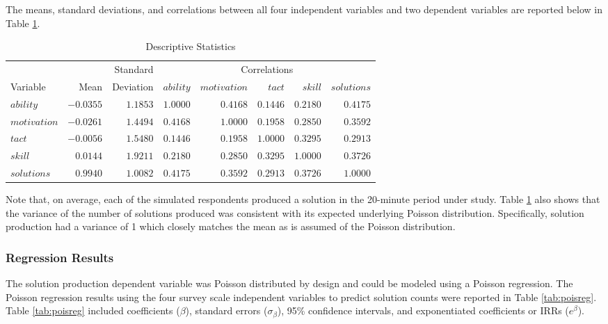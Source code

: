 \documentclass[man]{apa7}
\begin{document}
	The means, standard deviations, and correlations between all four independent variables and two dependent variables are reported below in Table \ref{tab:desc}. 
	
	\begin{table}[h!]
		\centering
		\caption{\centering Descriptive Statistics} 
		\begin{tabular}{lrr|rrrrr}
			\hline 
			&  & Standard & \multicolumn{5}{c}{Correlations} \\ 
			Variable & Mean & Deviation & $ability$ & $motivation$ & $tact$ & $skill$ & $solutions$ \\ 
			\hline
			$ability$ & $-0.0355$ & $1.1853$ & $1.0000$ & $0.4168$ & $0.1446$ & $0.2180$ & $0.4175$ \\ 
			$motivation$ & $-0.0261$ & $1.4494$ & $0.4168$ & $1.0000$ & $0.1958$ & $0.2850$ & $0.3592$ \\ 
			$tact$ & $-0.0056$ & $1.5480$ & $0.1446$ & $0.1958$ & $1.0000$ & $0.3295$ & $0.2913$ \\ 
			$skill$ & $0.0144$ & $1.9211$ & $0.2180$ & $0.2850$ & $0.3295$ & $1.0000$ & $0.3726$ \\ 
			$solutions$ & $0.9940$ & $1.0082$ & $0.4175$ & $0.3592$ & $0.2913$ & $0.3726$ & $1.0000$ \\ 
			\hline 
		\end{tabular}
		\label{tab:desc}
	\end{table}
	
	Note that, on average, each of the simulated respondents produced a solution in the 20-minute period under study.
	Table \ref{tab:desc} also shows that the variance of the number of solutions produced was consistent with its expected underlying Poisson distribution.
	Specifically, solution production had a variance of 1 which closely matches the mean as is assumed of the Poisson distribution. 

		\subsubsection{Regression Results}
		
	The solution production dependent variable was Poisson distributed by design and could be modeled using a Poisson regression.
	The Poisson regression results using the four survey scale independent variables to predict solution counts were reported in Table \ref{tab:poisreg}. 
	Table \ref{tab:poisreg} included coefficients ($\beta$), standard errors ($\sigma_{\beta}$), 95\% confidence intervals, and exponentiated coefficients or IRRs ($e^{\beta}$).
	
\end{document}
